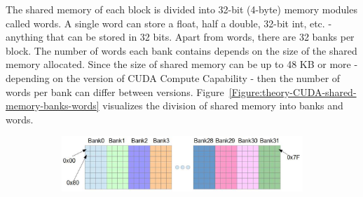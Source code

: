 The shared memory of each block is divided into 32-bit (4-byte) memory modules called words. A single word can store a float, half a double, 32-bit int, etc. - anything that can be stored in 32 bits. Apart from words, there are 32 banks per block. The number of words each bank contains depends on the size of the shared memory allocated. Since the size of shared memory can be up to 48 KB or more - depending on the version of CUDA Compute Capability - then the number of words per bank can differ between versions. Figure~\ref{Figure:theory-CUDA-shared-memory-banks-words} visualizes the division of shared memory into banks and words.

\begin{figure}[ht!]
	\centering
	\begin{subfigure}{\textwidth}
		\centering
		\includegraphics[width=14.5cm, keepaspectratio]{images/ch1/CUDA_shared_memory_banks_words.png}
		\label{Figure:theory-CUDA-shared-memory-banks-words-bytes}
	\end{subfigure}


\end{figure}

